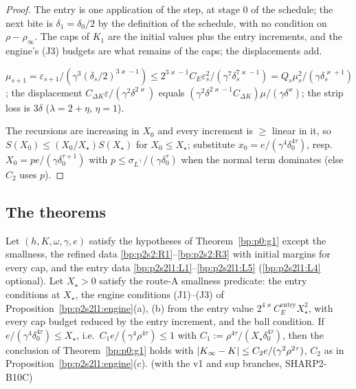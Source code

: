 \begin{proof}
\label{step:p2s2l1:en-restart}
The entry is one application of the step, at stage $0$ of the schedule; the next bite is $\delta_1=\delta_0/2$ by the definition of the schedule,
with no condition on $\rho-\rho_\infty$. The caps of $K_1$ are the initial values plus the entry increments, and the engine's (J3) budgets are what
remains of the caps; the displacements add.

\label{step:p2s2l1:en-A}
$\mu_{s+1}=\varepsilon_{s+1}/(\gamma^3(\delta_s/2)^{3\varkappa-1})\le2^{3\varkappa-1}C_E\varepsilon_s^2/(\gamma^7\delta_s^{7\varkappa-1})=Q_s\mu_s^2/(\gamma\delta_s^{\varkappa+1})$; the displacement
$C_{\Delta K}\varepsilon/(\gamma^2\delta^{2\varkappa})$ equals $(\gamma^2\delta^{2\varkappa-1}C_{\Delta K})\mu/(\gamma\delta^\varkappa)$; the strip loss is $3\delta$ ($\lambda=2+\eta$, $\eta=1$).

\label{step:p2s2l1:en-cl}
The recursions are increasing in $X_0$ and every increment is $\ge$ linear in it, so $S(X_0)\le(X_0/X_\star)S(X_\star)$ for $X_0\le X_\star$; substitute
$x_0=e/(\gamma^4\delta_0^{4\tau})$, resp.\ $X_0=pe/(\gamma\delta_0^{\tau+1})$ with $p\le\sigma_{L^\top}/(\gamma\delta_0^\tau)$ when the normal term dominates (else $C_2$ uses $p$).
\end{proof}

\subsection{The theorems}\label{bp:p2s2l1:sec-g1}

\begin{theorem}\label{bp:p2s2l1:g1A}
Let $(h,K,\omega,\gamma,e)$ satisfy the hypotheses of Theorem~\ref{bp:p0:g1} except the smallness, the refined data \ref{bp:p2s2:R1}--\ref{bp:p2s2:R3}
with initial margins for every cap, and the entry data \ref{bp:p2s2l1:L1}--\ref{bp:p2s2l1:L5} (\ref{bp:p2s2l1:L4} optional). Let $X_\star>0$ satisfy the route-A
smallness predicate: the entry conditions at $X_\star$, the engine conditions (J1)--(J3) of Proposition~\ref{bp:p2s2l1:engine}(a), (b) from the entry
value $2^{4\varkappa}C_E^{\mathrm{entry}}X_\star^2$, with every cap budget reduced by the entry increment, and the ball condition. If
$e/(\gamma^4\delta_0^{4\tau})\le X_\star$, i.e.\ $C_1e/(\gamma^4\rho^{4\tau})\le1$ with $C_1:=\rho^{4\tau}/(X_\star\delta_0^{4\tau})$, then the conclusion of Theorem~\ref{bp:p0:g1}
holds with $\lvert K_\infty-K\rvert\le C_2e/(\gamma^2\rho^{2\tau})$, $C_2$ as in Proposition~\ref{bp:p2s2l1:engine}(c).
 (with the v1 and sup branches, SHARP2-B10C)
\end{theorem}

